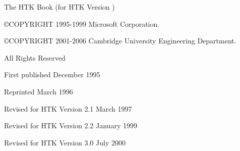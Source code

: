 \documentclass[a4paper,oneside]{book}
\begin{document}
{\vspace{0.5cm}





\noindent The HTK Book (for HTK Version \version)





\vspace{1.0cm}





\noindent \copyright COPYRIGHT 1995-1999 Microsoft Corporation. 





\noindent \copyright COPYRIGHT 2001-2006 Cambridge University Engineering Department. 





\vspace{0.2cm}





\noindent All Rights Reserved





\vspace{0,5cm}





\noindent First published December 1995


\vspace{0.1cm}





\noindent Reprinted March 1996 


\vspace{0.1cm}





\noindent Revised for HTK Version 2.1 March 1997 


\vspace{0.1cm}





\noindent Revised for HTK Version 2.2 January 1999 


\vspace{0.1cm}





\noindent Revised for HTK Version 3.0 July 2000 


}
\end{document}
